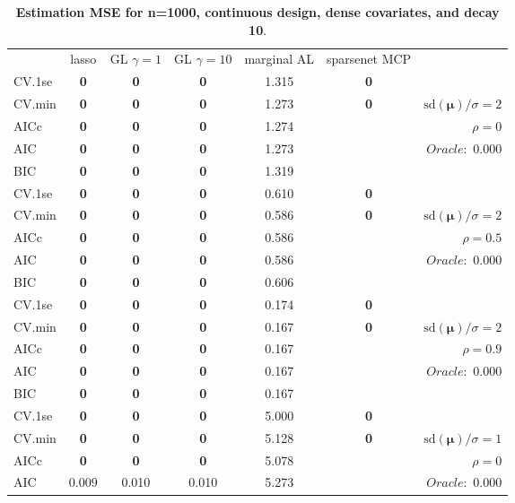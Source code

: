\clearpage
\begin{table}\vspace{-.5cm}
\caption[l]{ { \bf Estimation MSE for n=1000, continuous design, 
dense covariates, and  decay  10}.}
\vspace{-.5cm}
\footnotesize{}
\begin{center}
\begin{tabular}{l*{5}{c}|r}
& lasso & GL $\gamma=1$ & GL $\gamma=10$ & marginal AL & sparsenet MCP  & \\
 \cline{1-7}
CV.1se & {\bf 0} & {\bf 0} & {\bf 0} & 1.315 & {\bf 0} & \\
CV.min & {\bf 0} & {\bf 0} & {\bf 0} & 1.273 & {\bf 0} &  $\mathrm{sd}(\mathbf{\mu})/\sigma=2$ \\
AICc & {\bf 0} & {\bf 0} & {\bf 0} & 1.274 & & $\rho=0$ \\
AIC & {\bf 0} & {\bf 0} & {\bf 0} & 1.273 & &  \multirow{2}{*}{$Oracle: $ 0.000} \\
BIC & {\bf 0} & {\bf 0} & {\bf 0} & 1.319 & &  \\
 \hline 
CV.1se & {\bf 0} & {\bf 0} & {\bf 0} & 0.610 & {\bf 0} & \\
CV.min & {\bf 0} & {\bf 0} & {\bf 0} & 0.586 & {\bf 0} &  $\mathrm{sd}(\mathbf{\mu})/\sigma=2$ \\
AICc & {\bf 0} & {\bf 0} & {\bf 0} & 0.586 & & $\rho=0.5$ \\
AIC & {\bf 0} & {\bf 0} & {\bf 0} & 0.586 & &  \multirow{2}{*}{$Oracle: $ 0.000} \\
BIC & {\bf 0} & {\bf 0} & {\bf 0} & 0.606 & &  \\
 \hline 
CV.1se & {\bf 0} & {\bf 0} & {\bf 0} & 0.174 & {\bf 0} & \\
CV.min & {\bf 0} & {\bf 0} & {\bf 0} & 0.167 & {\bf 0} &  $\mathrm{sd}(\mathbf{\mu})/\sigma=2$ \\
AICc & {\bf 0} & {\bf 0} & {\bf 0} & 0.167 & & $\rho=0.9$ \\
AIC & {\bf 0} & {\bf 0} & {\bf 0} & 0.167 & &  \multirow{2}{*}{$Oracle: $ 0.000} \\
BIC & {\bf 0} & {\bf 0} & {\bf 0} & 0.167 & &  \\
 \hline 
CV.1se & {\bf 0} & {\bf 0} & {\bf 0} & 5.000 & {\bf 0} & \\
CV.min & {\bf 0} & {\bf 0} & {\bf 0} & 5.128 & {\bf 0} &  $\mathrm{sd}(\mathbf{\mu})/\sigma=1$ \\
AICc & {\bf 0} & {\bf 0} & {\bf 0} & 5.078 & & $\rho=0$ \\
AIC & 0.009 & 0.010 & 0.010 & 5.273 & &  \multirow{2}{*}{$Oracle: $ 0.000} \\

\end{tabular}
\end{center}
\end{table}
